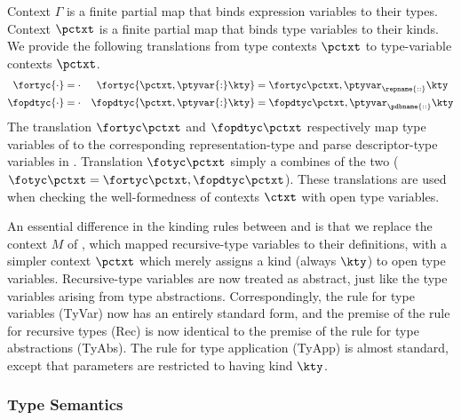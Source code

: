Context $\Gamma$ is a finite partial map that binds expression
variables to their types.
Context $\pctxt$ is a finite partial map that binds type
variables to their kinds. We provide the following translations from
type contexts $\pctxt$ to \fomega type-variable contexts $\pctxt$.
\begin{align*}
\fortyc {\cdot} &= \cdot &
\fortyc {\pctxt,\ptyvar{:}\kty} &= \fortyc \pctxt, \ptyvar_\repname
{\mathrel{::}} \kty \\
\fopdtyc {\cdot} &= \cdot &
\fopdtyc {\pctxt,\ptyvar{:}\kty} &= \fopdtyc \pctxt, \ptyvar_\pdbname
{\mathrel{::}} \kty
\end{align*}
The translation $\fortyc \pctxt$ and $\fopdtyc \pctxt$ respectively map type
variables of \ddc{} to the corresponding representation-type and parse
descriptor-type variables in \fomega. Translation
$\fotyc \pctxt$ simply a combines of the two ($\fotyc \pctxt = \fortyc \pctxt, \fopdtyc \pctxt$).  These
translations are used when checking the well-formedness of contexts
$\ctxt$ with open type variables.

An essential difference in the kinding rules between \ddcold{} and
\ddc{} is that we replace the context $M$ of \ddcold{}, which mapped
recursive-type variables to their definitions, with a simpler context
$\pctxt$ which merely assigns a kind (always $\kty$) to open type
variables. Recursive-type variables are now treated as abstract, just
like the type variables arising from type abstractions.
Correspondingly, the rule for type variables (TyVar) now has an
entirely standard form, and the premise of the rule for recursive types
(Rec) is now identical to the premise of the rule for type abstractions
(TyAbs). The rule for type application (TyApp) is almost standard,
except that parameters are restricted to having kind $\kty$. 

\subsubsection{Type Semantics}
\label{sec:intty-sem}

